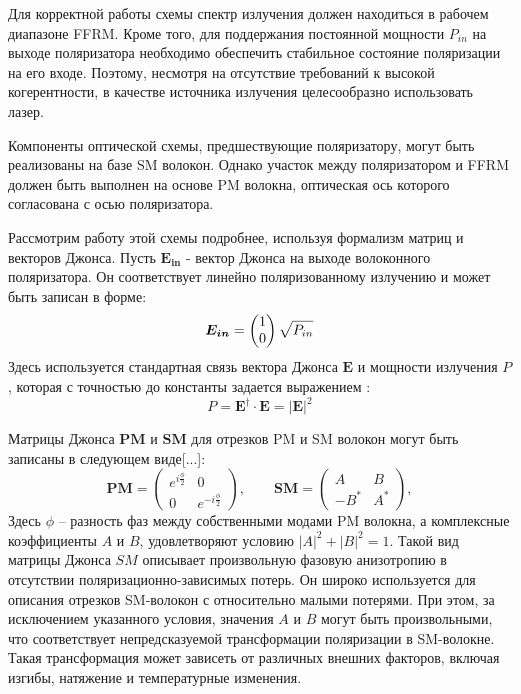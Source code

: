 \documentclass{article}
\begin{document}
Для корректной работы схемы спектр излучения должен находиться в рабочем диапазоне FFRM.
Кроме того, для поддержания постоянной мощности $P_{in}$ на выходе поляризатора необходимо обеспечить стабильное состояние поляризации на его входе.
Поэтому, несмотря на отсутствие требований к высокой когерентности, в качестве источника излучения целесообразно использовать лазер.

Компоненты оптической схемы, предшествующие поляризатору, могут быть реализованы на базе SM волокон.
Однако участок между поляризатором и FFRM должен быть выполнен на основе PM волокна, оптическая ось которого согласована с осью поляризатора.


Рассмотрим работу этой схемы  подробнее, используя формализм матриц и векторов Джонса.
Пусть $\bm{E_{in}}$ - вектор Джонса на выходе волоконного поляризатора.
Он соответствует линейно поляризованному излучению и может быть записан в форме:
\begin{equation}
	\label{eq:Ein}
	\bm{E_{in}} = \begin{pmatrix} 1 \\ 0 \end{pmatrix}\sqrt{P_{in}} \\
\end{equation}
Здесь используется стандартная связь вектора Джонса $\bm{E}$ и мощности излучения $P$, которая с точностью до константы задается выражением \autocite{azzamEllipsometryPolarizedLight1977}: 	
\begin{equation}
	\label{eq:P-E}
	P = \bm{E^\dagger} \cdot \bm{E} = \left|\bm{E} \right|^2 
\end{equation}

Матрицы Джонса $\bm{PM}$ и $\bm{SM}$ для отрезков PM и SM волокон  могут быть записаны в следующем виде[...]:
\begin{equation}
\label{eq:PM-SM}
    \bm{PM} = 
    \begin{pmatrix}
    e^{i\frac{\phi}{2}} & 0 \\
    0 & e^{-i\frac{\phi}{2}}
    \end{pmatrix},
    \qquad 
    \bm{SM} = 
    \begin{pmatrix}
    A & B \\
    -B^* & A^*
    \end{pmatrix},
\end{equation}
Здесь $\phi$ – разность фаз между собственными модами PM волокна, а комплексные коэффициенты $A$ и $B$, удовлетворяют условию $|A|^2 + |B|^2 = 1$.
Такой вид матрицы Джонса $SM$ описывает произвольную фазовую анизотропию в отсутствии поляризационно-зависимых потерь.
Он широко используется для описания отрезков SM-волокон с относительно малыми потерями.
При этом, за исключением указанного условия, значения $A$ и $B$ могут быть произвольными, что соответствует непредсказуемой трансформации поляризации в SM-волокне.
Такая трансформация может зависеть от различных внешних факторов, включая изгибы, натяжение и температурные изменения.
\end{document}

